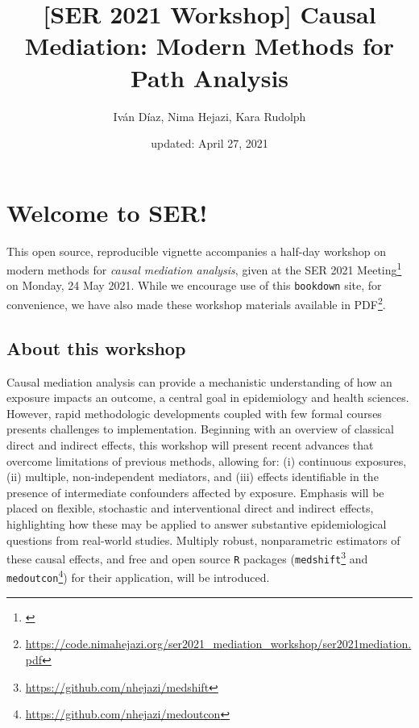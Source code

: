 \documentclass[
  12pt, krantz2,
]{book}
\title{{[}SER 2021 Workshop{]} Causal Mediation: Modern Methods for Path Analysis}
\author{Iván Díaz, Nima Hejazi, Kara Rudolph}
\date{updated: April 27, 2021}
\newcommand{\passthrough}[1]{#1}
\renewcommand{\href}[2]{#2\footnote{\url{#1}}}
\theoremstyle{definition}
\theoremstyle{definition}
\theoremstyle{definition}
\newcommand{\1}{\mathbbm{1}}
\begin{document}
\maketitle


\thispagestyle{empty}

\begin{center}

\end{center}

\setlength{\abovedisplayskip}{-5pt}
\setlength{\abovedisplayshortskip}{-5pt}

{
\hypersetup{linkcolor=}
\setcounter{tocdepth}{1}
\tableofcontents
}
\listoftables
\listoffigures
\hypertarget{welcome-to-ser}{%
\chapter*{Welcome to SER!}\label{welcome-to-ser}}


This open source, reproducible vignette accompanies a half-day workshop on
modern methods for \emph{causal mediation analysis}, given at the \href{}{SER 2021
Meeting} on Monday, 24 May 2021. While we encourage use of this \passthrough{\lstinline!bookdown!}
site, for convenience, we have also made these workshop materials \href{https://code.nimahejazi.org/ser2021_mediation_workshop/ser2021mediation.pdf}{available in
PDF}.

\hypertarget{about}{%
\section{About this workshop}\label{about}}

Causal mediation analysis can provide a mechanistic understanding of how an
exposure impacts an outcome, a central goal in epidemiology and health sciences.
However, rapid methodologic developments coupled with few formal courses
presents challenges to implementation. Beginning with an overview of classical
direct and indirect effects, this workshop will present recent advances that
overcome limitations of previous methods, allowing for: (i) continuous
exposures, (ii) multiple, non-independent mediators, and (iii) effects
identifiable in the presence of intermediate confounders affected by exposure.
Emphasis will be placed on flexible, stochastic and interventional direct and
indirect effects, highlighting how these may be applied to answer substantive
epidemiological questions from real-world studies. Multiply robust,
nonparametric estimators of these causal effects, and free and open source \passthrough{\lstinline!R!}
packages (\href{https://github.com/nhejazi/medshift}{\passthrough{\lstinline!medshift!}} and
\href{https://github.com/nhejazi/medoutcon}{\passthrough{\lstinline!medoutcon!}}) for their application, will
be introduced.
\end{document}
